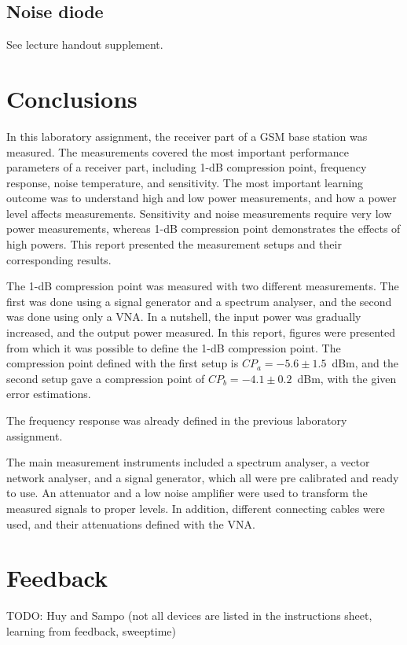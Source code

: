 \documentclass[a4paper, 12pt]{article}
\begin{document}
\subsection{Noise diode}

See lecture handout supplement.


\newpage
\section{Conclusions}

In this laboratory assignment, the receiver part of a GSM base station was measured. The measurements covered the most important performance parameters of a receiver part, including 1-dB compression point, frequency response, noise temperature, and sensitivity. The most important learning outcome was to understand high and low power measurements, and how a power level affects measurements. Sensitivity and noise measurements require very low power measurements, whereas 1-dB compression point demonstrates the effects of high powers. This report presented the measurement setups and their corresponding results.

The 1-dB compression point was measured with two different measurements. The first was done using a signal generator and a spectrum analyser, and the second was done using only a VNA. In a nutshell, the input power was gradually increased, and the output power measured. In this report, figures were presented from which it was possible to define the 1-dB compression point. The compression point defined with the first setup is $CP_a = -5.6 \pm 1.5$~dBm, and the second setup gave a compression point of $CP_b = -4.1 \pm 0.2$~dBm, with the given error estimations.

The frequency response was already defined in the previous laboratory assignment. 

The main measurement instruments included a spectrum analyser, a vector network analyser, and a signal generator, which all were pre calibrated and ready to use. An attenuator and a low noise amplifier were used to transform the measured signals to proper levels. In addition, different connecting cables were used, and their attenuations defined with the VNA.




\newpage
\section{Feedback}

TODO: Huy and Sampo (not all devices are listed in the instructions sheet, learning from feedback, sweeptime)
\end{document}
